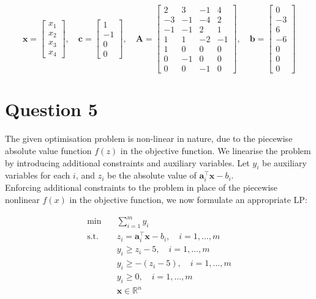 \documentclass[12pt]{article}
\begin{document}
\begin{equation*}
    \mathbf{x} = \begin{bmatrix}
        x_{1} \\ x_{2} \\ x_{3} \\ x_{4} 
    \end{bmatrix},
    \quad 
    \mathbf{c} = \begin{bmatrix}
        1 \\ -1 \\ 0 \\ 0
    \end{bmatrix},
    \quad 
    \mathbf{A} = \begin{bmatrix}
        2 & 3 & -1 & 4 \\ 
        -3 & -1 & -4 & 2 \\ 
        -1 & -1 & 2 & 1 \\ 
        1 & 1 & -2 & -1 \\ 
        1 & 0 & 0 & 0 \\ 
        0 & -1 & 0 & 0 \\ 
        0 & 0 & -1 & 0 
    \end{bmatrix},
    \quad 
    \mathbf{b} = \begin{bmatrix}
        0 \\ -3 \\ 6 \\ -6 \\ 0 \\ 0 \\ 0
    \end{bmatrix}
\end{equation*}

\newpage 
\section*{Question 5}
The given optimisation problem is non-linear in nature, due to the piecewise absolute value function $f(z)$ in the objective function. We linearise the problem by introducing additional constraints and auxiliary variables. Let $y_i$ be auxiliary variables for each $i$, and $z_i$ be the absolute value of $\mathbf{a}^{\top}_i \mathbf{x}- b_i$. \\

\noindent Enforcing additional constraints to the problem in place of the piecewise nonlinear $f(x)$ in the objective function, we now formulate an appropriate LP:

\begin{align}
    \nonumber \min \quad & \sum_{i=1}^{m} y_i \\ 
    \text{s.t.} \quad & z_i = \mathbf{a}^{\top}_i \mathbf{x} - b_i, \quad i = 1, \dots , m \\ 
    & y_i \geq z_i - 5,  \quad i = 1, \dots , m \\ 
    & y_i \geq -(z_i - 5), \quad i = 1, \dots , m \\ 
    & y_i \geq 0, \quad i = 1, \dots , m  \\
    & \mathbf{x} \in \mathbb{R}^{n} 
\end{align}
\end{document}
